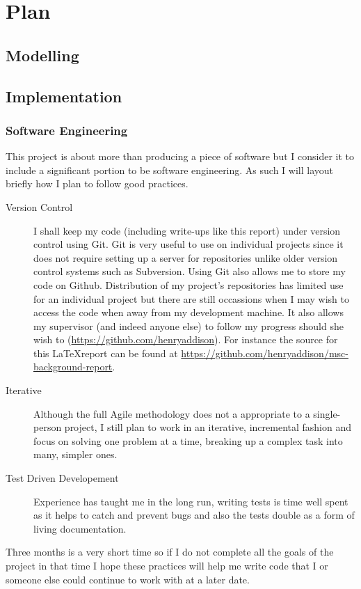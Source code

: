 \chapter{Plan}
\section{Modelling}

\section{Implementation}

\subsection{Software Engineering}
This project is about more than producing a piece of software but I
consider it to include a significant portion to be software
engineering.  As such I will layout briefly how I plan to follow good
practices. 

\begin{description}
  \item[Version Control] I shall keep my
code (including write-ups like this report) under version control
using Git. Git is very useful to use on individual projects since it
does not require setting up a server for repositories unlike older
version control systems such as Subversion. Using Git also allows me
to store my code on Github. Distribution of my project's repositories
has limited use for an individual project but there are still
occassions when I may wish to access the code when away from my
development machine. It also allows my supervisor (and indeed anyone
else) to follow my progress should she wish to (\url{https://github.com/henryaddison}).
For instance the source for this \LaTeX report can be found at
\url{https://github.com/henryaddison/msc-background-report}. 

  \item[Iterative] Although the full Agile methodology does not a appropriate to a single-person
project, I still plan to work in an iterative, incremental fashion and
focus on solving one problem at a time, breaking up a complex
task into many, simpler ones. 

  \item[Test Driven Developement] Experience has taught me in the long run, writing
tests is time well spent as it helps to catch and prevent bugs and
also the tests double as a form of living documentation. 

\end{description}

Three months is a very short time so if I do not complete all the goals of the project in
that time I hope these practices will help me write code that I or someone else
could continue to work with at a later date.
